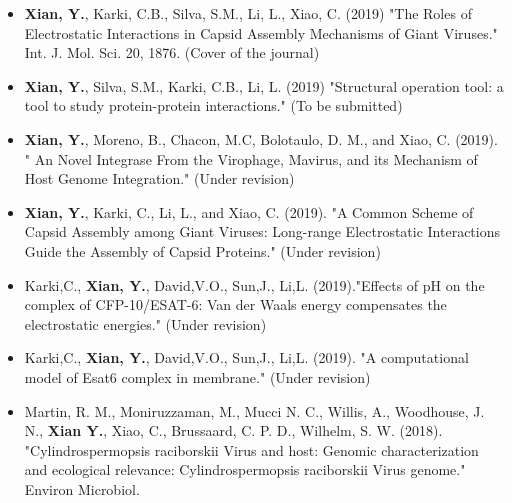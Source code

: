 %
%


\begin{minipage}[t]{0.75\textwidth}
\begin{itemize}
    \item \textbf{ Xian, Y.}, Karki, C.B., Silva, S.M., Li, L., Xiao, C. (2019) "The Roles of Electrostatic Interactions in Capsid Assembly Mechanisms of Giant Viruses." Int. J. Mol. Sci. 20, 1876. (Cover of the journal)
    
    \item \textbf{ Xian, Y.}, Silva, S.M., Karki, C.B., Li, L. (2019) "Structural operation tool: a tool to study protein-protein interactions." (To be submitted)
    
    \item \textbf{Xian, Y.}, Moreno, B., Chacon, M.C, Bolotaulo, D. M., and Xiao, C. (2019). " An Novel Integrase From the Virophage, Mavirus, and its Mechanism of Host Genome Integration." (Under revision)
    
    \item \textbf{Xian, Y.}, Karki, C., Li, L., and Xiao, C. (2019). "A Common Scheme of Capsid Assembly among Giant Viruses: Long-range Electrostatic Interactions Guide the Assembly of Capsid Proteins." (Under revision)

    \item Karki,C., \textbf{Xian, Y.}, David,V.O., Sun,J., Li,L. (2019)."Effects of pH on the complex of CFP-10/ESAT-6: Van der Waals energy compensates the electrostatic energies."  (Under revision)
    
    \item Karki,C., \textbf{Xian, Y.}, David,V.O., Sun,J., Li,L. (2019). "A computational model of Esat6 complex in membrane." (Under revision)

    \item Martin, R. M., Moniruzzaman, M., Mucci N. C., Willis, A., Woodhouse, J. N.,\textbf{ Xian Y.}, Xiao, C., Brussaard, C. P. D., Wilhelm, S. W. (2018). "Cylindrospermopsis raciborskii Virus and host: Genomic characterization and ecological relevance: Cylindrospermopsis raciborskii Virus genome." Environ Microbiol.
    

\end{itemize}
\end{minipage}
